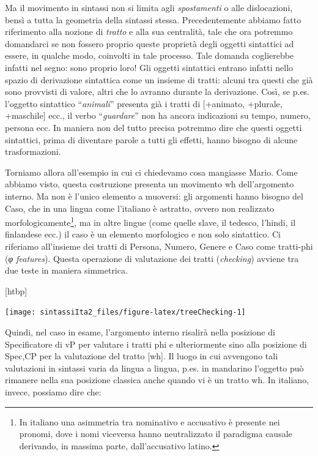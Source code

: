 \documentclass[
  a4paper,
  twoside,
  11pt,
  chapterprefix=false,
  bibliography=totocnumbered,
  listof=flat]{scrbook}
\makeatletter
\def\fps@figure{htbp}
\renewenvironment{figure}[1][\fps@figure]{
  \edef\@tempa{\noexpand\@float{figure}[#1]} 
  \@tempa
  \sffamily
}{
  \end@float
}
\makeatother
\begin{document}
Ma il movimento in sintassi non si limita agli \emph{spostamenti} o alle dislocazioni, bensì a tutta la geometria della sintassi stessa. Precedentemente abbiamo fatto riferimento alla nozione di \emph{tratto} e alla sua centralità, tale che ora potremmo domandarci se non fossero proprio queste proprietà degli oggetti sintattici ad essere, in qualche modo, coinvolti in tale processo. Tale domanda coglierebbe infatti nel segno: sono proprio loro!
Gli oggetti sintattici entrano infatti nello spazio di derivazione sintattica come un insieme di tratti: alcuni tra questi che già sono provvisti di valore, altri che lo avranno durante la derivazione. Così, se p.es. l'oggetto sintattico \enquote{\emph{animali}} presenta già i tratti di {[}+animato, +plurale, +maschile{]} ecc., il verbo \enquote{\emph{guardare}} non ha ancora indicazioni su tempo, numero, persona ecc. In maniera non del tutto precisa potremmo dire che questi oggetti sintattici, prima di diventare parole a tutti gli effetti, hanno bisogno di alcune trasformazioni.

Torniamo allora all'esempio in cui ci chiedevamo cosa mangiasse Mario. Come abbiamo visto, questa costruzione presenta un movimento wh dell'argomento interno. Ma non è l'unico elemento a muoversi: gli argomenti hanno bisogno del Caso, che in una lingua come l'italiano è astratto, ovvero non realizzato morfologicamente\footnote{In italiano una asimmetria tra nominativo e accusativo è presente nei pronomi, dove i nomi viceversa hanno neutralizzato il paradigma causale derivando, in massima parte, dall'accusativo latino.}, ma in altre lingue (come quelle slave, il tedesco, l'hindi, il finlandese ecc.) il caso è un elemento morfologico e non solo sintattico.
Ci riferiamo all'insieme dei tratti di Persona, Numero, Genere e Caso come tratti-phi (\emph{φ features}).
Questa operazione di valutazione dei tratti (\emph{checking}) avviene tra due teste in maniera simmetrica.

\begin{figure}

{\centering \texttt{[image: sintassiIta2\_files/figure-latex/treeChecking-1]} 

}

\caption{Valutazione dei tratti}\label{fig:treeChecking}
\end{figure}

Quindi, nel caso in esame, l'argomento interno risalirà nella posizione di Specificatore di vP per valutare i tratti phi e ulteriormente sino alla posizione di Spec,CP per la valutazione del tratto {[}wh{]}. Il luogo in cui avvengono tali valutazioni in sintassi varia da lingua a lingua, p.es. in mandarino l'oggetto può rimanere nella sua posizione classica anche quando vi è un tratto wh. In italiano, invece, possiamo dire che:
\end{document}
